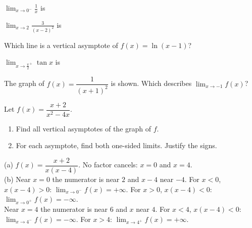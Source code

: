 \begin{exo}{}
$\displaystyle\lim_{x\to0^-}\frac1x$ is
\end{exo}
\begin{exo}{}
$\displaystyle\lim_{x\to2}\frac{3}{(x-2)^2}$ is
\end{exo}
\begin{exo}{}
Which line is a vertical asymptote of $f(x)=\ln(x-1)$?
\end{exo}
\begin{exo}{}
$\displaystyle\lim_{x\to\frac\pi2^+}\tan x$ is
\end{exo}
\begin{exo}[graph]{}
\begin{minipage}{\linewidth}
The graph of $f(x)=\dfrac{1}{(x+1)^2}$ is shown. Which describes $\displaystyle\lim_{x\to-1}f(x)$?
\begin{center}\end{center}
\end{minipage}
\end{exo}
\begin{exo}{}
Let $f(x)=\dfrac{x+2}{x^2-4x}$.
\begin{enumerate}[label=(\alph*)]
\item Find all vertical asymptotes of the graph of $f$.
\item For each asymptote, find both one-sided limits. Justify the signs.
\end{enumerate}
\begin{solution}
(a) $f(x)=\dfrac{x+2}{x(x-4)}$. No factor cancels: $x=0$ and $x=4$.\\
(b) Near $x=0$ the numerator is near $2$ and $x-4$ near $-4$. For $x<0$, $x(x-4)>0$: $\lim_{x\to0^-}f(x)=+\infty$. For $x>0$, $x(x-4)<0$: $\lim_{x\to0^+}f(x)=-\infty$.\\
Near $x=4$ the numerator is near $6$ and $x$ near $4$. For $x<4$, $x(x-4)<0$: $\lim_{x\to4^-}f(x)=-\infty$. For $x>4$: $\lim_{x\to4^+}f(x)=+\infty$.
\end{solution}
\end{exo}

